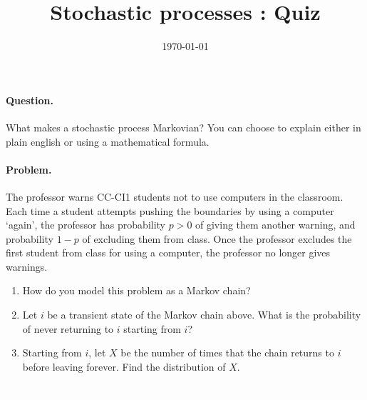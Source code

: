 \documentclass[12pt,a4paper]{article}
\title{ \bfseries \Huge {Stochastic processes : Quiz}}
\date{\today}
\newcounter{num}  %
\begin{document}
	\maketitle
	
	\paragraph{Question.} What makes a stochastic process Markovian? You can choose to explain either in plain english or using a mathematical formula.
	
	\vspace{6cm}   
	\paragraph{Problem.}
	The professor warns CC-CI1 students not to use computers in the classroom.
	Each time a student attempts pushing the boundaries by using a computer `again', the professor has probability $p>0$ of giving them another warning, and probability $1-p$ of excluding them from class.
	Once the professor excludes the first student from class for using a computer, the professor no longer gives warnings.
	\begin{enumerate}
		\item How do you model this problem as a Markov chain?
		\vspace{11cm} 
		
		\item Let $i$ be a transient state of the Markov chain above. 
		What is the probability of never returning to $i$ starting from $i$?
		\vspace{9cm} 
		
		\item Starting from $i$, let $X$ be the number of
		times that the chain returns to $i$ before leaving forever.
		Find the distribution of $X$.
		\vspace{13cm} 
	\end{enumerate}
	
	\textcolor{white}{a}
	
	
\end{document}
